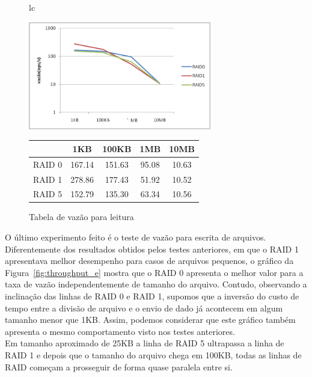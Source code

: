 	\begin{figure}[h]
		\begin{tabular}{lc}
			\begin{minipage}{.50\textwidth}
				\begin{center}
					
					\includegraphics[clip,width=8.0cm]{images/resultados/throughput_leitura.png}
					\caption{Gráfico de vazão para leitura(ops/s)}
					\label{fig:throughput_l}
					
				\end{center}
				
			\end{minipage}
			
			\begin{minipage}{.5\textwidth}
				\makeatletter
				\def\@captype{table}
				\makeatother
				\caption{Tabela de vazão para leitura}
				\label{tab:throughput_l}
				\begin{center}
					\begin{tabular}{|c|c|c|c|c|} \hline
						& 1KB & 100KB & 1MB & 10MB \\ \hline
						
						RAID 0	& 167.14 & 151.63 & 95.08 & 10.63\\ \hline
						RAID 1	& 278.86 & 177.43 & 51.92 & 10.52\\ \hline
						RAID 5	& 152.79 & 135.30 & 63.34 & 10.56\\ \hline
						
					\end{tabular}
				\end{center}
				
			\end{minipage}
		\end{tabular}
	\end{figure}
	
	
	O último experimento feito é o teste de vazão para escrita de arquivos.
	Diferentemente dos resultados obtidos pelos testes anteriores, em que o RAID 1 apresentava melhor desempenho para casos de arquivos pequenos, o gráfico da Figura~\ref{fig:throughput_e} mostra que o RAID 0 apresenta o melhor valor para a taxa de vazão independentemente de tamanho do arquivo. 
	Contudo, observando a inclinação das linhas de RAID 0 e RAID 1, supomos que a inversão do custo de tempo entre a divisão de arquivo e o envio de dado já acontecem em algum tamanho menor que 1KB. Assim, podemos considerar que este gráfico também apresenta o mesmo comportamento visto nos testes anteriores. 
	\\
	Em tamanho aproximado de 25KB a linha de RAID 5 ultrapassa a linha de RAID 1 e depois que o tamanho do arquivo chega em 100KB, todas as linhas de RAID começam a prosseguir de forma quase paralela entre si.
	\\
	
